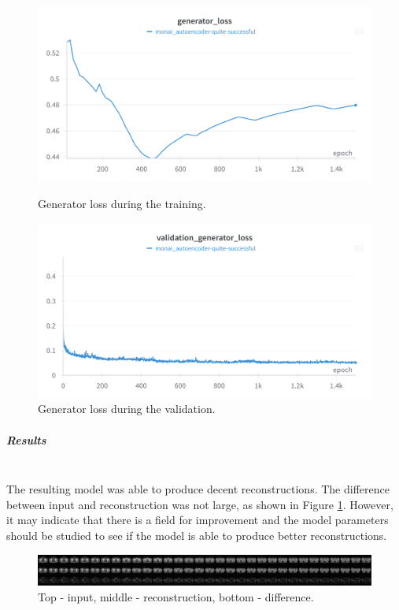 \begin{figure}[H]
\includegraphics[width=\linewidth]{detailed_engineering/Monai Autoencoder/charts/generator_loss.png}
\caption{Generator loss during the training.}
\endminipage\hfill
{}
\includegraphics[width=\linewidth]{detailed_engineering/Monai Autoencoder/charts/val_generator_loss.png}
\caption{Generator loss during the validation.}
\endminipage
\end{figure}


\subparagraph{Results}\mbox{}\\

The resulting model was able to produce decent reconstructions. The difference between input and reconstruction was not large, as shown in Figure \ref{fig:monai-vae-comparison}. However, it may indicate that there is a field for improvement and the model parameters should be studied to see if the model is able to produce better reconstructions.

\begin{figure}[H]
    \centering
    \includegraphics[width=\linewidth]{reports/monai_autoenc_comparison_full.png}
    \caption{Top - input, middle - reconstruction, bottom - difference.}
    \label{fig:monai-vae-comparison}
\end{figure}

